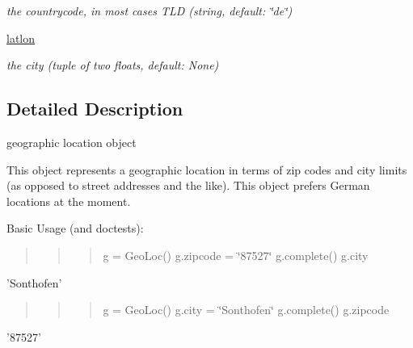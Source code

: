 \begin{DoxyCompactItemize}
\begin{DoxyCompactList}\small\item\em the countrycode, in most cases T\-L\-D (string, default\-: \char`\"{}de\char`\"{}) \end{DoxyCompactList}\item 
\hypertarget{classgeors_1_1GeoLoc_a3f6c5595b27d72c28c76d3eca0122f2f}{\hyperlink{classgeors_1_1GeoLoc_a3f6c5595b27d72c28c76d3eca0122f2f}{latlon}}\label{classgeors_1_1GeoLoc_a3f6c5595b27d72c28c76d3eca0122f2f}

\begin{DoxyCompactList}\small\item\em the city (tuple of two floats, default\-: None) \end{DoxyCompactList}\end{DoxyCompactItemize}


\subsection{Detailed Description}
geographic location object 

This object represents a geographic location in terms of zip codes and city limits (as opposed to street addresses and the like). This object prefers German locations at the moment.

Basic Usage (and doctests)\-:

\begin{quotation}
\begin{quotation}
\begin{quotation}
g = Geo\-Loc() g.\-zipcode = \char`\"{}87527\char`\"{} g.\-complete() g.\-city

\end{quotation}


\end{quotation}


\end{quotation}
'Sonthofen'

\begin{quotation}
\begin{quotation}
\begin{quotation}
g = Geo\-Loc() g.\-city = \char`\"{}\-Sonthofen\char`\"{} g.\-complete() g.\-zipcode

\end{quotation}


\end{quotation}


\end{quotation}
'87527'

